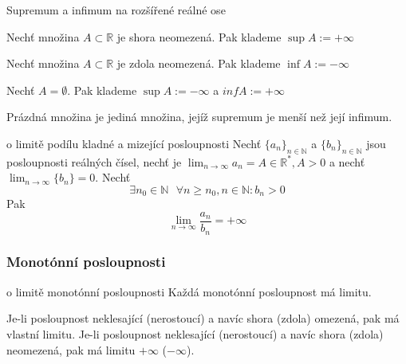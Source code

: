\begin{definiceN}{Supremum a infimum na rozšířené reálné ose}
\begin{pitemize}
	\item Nechť množina $A \subset \mathbb{R}$ je shora neomezená. Pak klademe $\sup A := +\infty$
	\item Nechť množina $A \subset \mathbb{R}$ je zdola neomezená. Pak klademe $\inf A := -\infty$
	\item Nechť $A=\emptyset$. Pak klademe $\sup A := -\infty$ a $inf A := +\infty$
\end{pitemize}
\end{definiceN}

\begin{poznamka}
Prázdná množina je jediná množina, jejíž supremum je menší než její infimum.
\end{poznamka}

\begin{vetaN}{o limitě podílu kladné a mizející posloupnosti}
Nechť $\{a_n\}_{n \in \mathbb{N}}$ a $\{b_n\}_{n \in \mathbb{N}}$ jsou posloupnosti reálných čísel, nechť je $\lim_{n \rightarrow \infty} a_n = A \in \mathbb{R}^*, A>0$ a nechť $\lim_{n \rightarrow \infty}\{b_n\}=0$. Nechť
$$
	\exists n_0 \in \mathbb{N} \textit{ } \forall n \ge n_0, n \in \mathbb{N}: b_n>0
$$
Pak
$$
	\lim_{n \rightarrow \infty} \frac{a_n}{b_n} = + \infty
$$
\end{vetaN}

\subsubsection{Monotónní posloupnosti}
\begin{vetaN}{o limitě monotónní posloupnosti}
Každá monotónní posloupnost má limitu.
\end{vetaN}

\begin{poznamka}
Je-li posloupnost neklesající (nerostoucí) a navíc shora (zdola) omezená, pak má vlastní limitu.
Je-li posloupnost neklesající (nerostoucí) a navíc shora (zdola) neomezená, pak má limitu $+ \infty$ ($- \infty$).
\end{poznamka}

